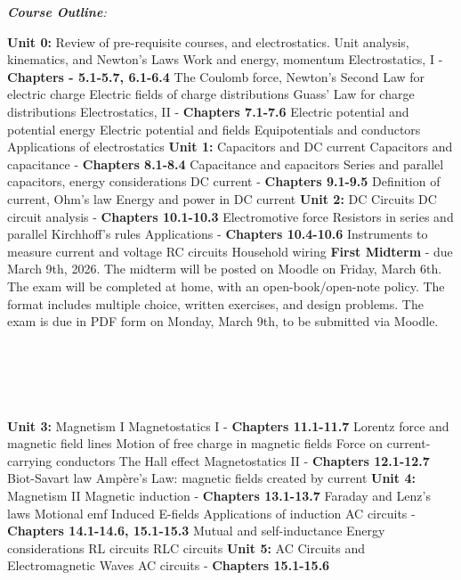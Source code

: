 \documentclass[10pt]{article}
\begin{document}
\twocolumn
\textit{\textbf{Course Outline}:}
\begin{outline}[enumerate]
\1 \textbf{Unit 0:} Review of pre-requisite courses, and electrostatics.
\2 Unit analysis, kinematics, and Newton's Laws
\2 Work and energy, momentum
\2 Electrostatics, I - \textbf{Chapters - 5.1-5.7, 6.1-6.4}
\3 The Coulomb force, Newton's Second Law for electric charge
\3 Electric fields of charge distributions
\3 Guass' Law for charge distributions
\2 Electrostatics, II - \textbf{Chapters 7.1-7.6}
\3 Electric potential and potential energy
\3 Electric potential and fields
\3 Equipotentials and conductors
\3 Applications of electrostatics
\1 \textbf{Unit 1:} Capacitors and DC current
\2 Capacitors and capacitance - \textbf{Chapters 8.1-8.4}
\3 Capacitance and capacitors
\3 Series and parallel capacitors, energy considerations
\2 DC current - \textbf{Chapters 9.1-9.5}
\3 Definition of current, Ohm's law
\3 Energy and power in DC current
\1 \textbf{Unit 2:} DC Circuits
\2 DC circuit analysis - \textbf{Chapters 10.1-10.3}
\3 Electromotive force
\3 Resistors in series and parallel
\3 Kirchhoff's rules
\2 Applications - \textbf{Chapters 10.4-10.6}
\3 Instruments to measure current and voltage
\3 RC circuits
\3 Household wiring
\1 \textbf{First Midterm} - due March 9th, 2026.
\2 The midterm will be posted on Moodle on Friday, March 6th.
\2 The exam will be completed at home, with an open-book/open-note policy.  The format includes multiple choice, written exercises, and design problems.
\2 The exam is due in PDF form on Monday, March 9th, to be submitted via Moodle. \\ \\ \\ \\ \\ \\
\1 \textbf{Unit 3:} Magnetism I
\2 Magnetostatics I - \textbf{Chapters 11.1-11.7}
\3 Lorentz force and magnetic field lines
\3 Motion of free charge in magnetic fields
\3 Force on current-carrying conductors
\3 The Hall effect
\2 Magnetostatics II - \textbf{Chapters 12.1-12.7}
\3 Biot-Savart law
\3 Amp\`{e}re's Law: magnetic fields created by current
\1 \textbf{Unit 4:} Magnetism II
\2 Magnetic induction - \textbf{Chapters 13.1-13.7}
\3 Faraday and Lenz's laws
\3 Motional emf
\3 Induced E-fields
\3 Applications of induction
\2 AC circuits - \textbf{Chapters 14.1-14.6, 15.1-15.3}
\3 Mutual and self-inductance
\3 Energy considerations
\3 RL circuits
\3 RLC circuits
\1 \textbf{Unit 5:} AC Circuits and Electromagnetic Waves
\2 AC circuits - \textbf{Chapters 15.1-15.6}

\end{outline}
\end{document}
